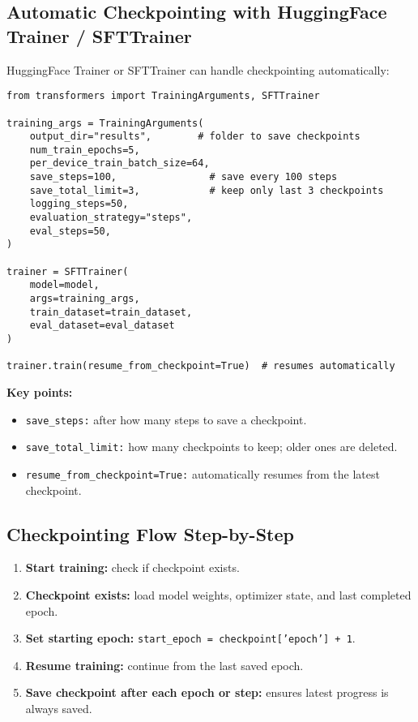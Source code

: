 \documentclass[a4paper, 12pt]{article}
\begin{document}
\subsection*{Automatic Checkpointing with HuggingFace Trainer / SFTTrainer}
HuggingFace Trainer or SFTTrainer can handle checkpointing automatically:

\begin{tcolorbox}[colback=green!5!white, colframe=green!75!black, title=TrainingArguments Example]
\begin{verbatim}
from transformers import TrainingArguments, SFTTrainer

training_args = TrainingArguments(
    output_dir="results",        # folder to save checkpoints
    num_train_epochs=5,
    per_device_train_batch_size=64,
    save_steps=100,                # save every 100 steps
    save_total_limit=3,            # keep only last 3 checkpoints
    logging_steps=50,
    evaluation_strategy="steps",
    eval_steps=50,
)

trainer = SFTTrainer(
    model=model,
    args=training_args,
    train_dataset=train_dataset,
    eval_dataset=eval_dataset
)

trainer.train(resume_from_checkpoint=True)  # resumes automatically
\end{verbatim}
\end{tcolorbox}

\textbf{Key points:}
\begin{itemize}
    \item \texttt{save\_steps:} after how many steps to save a checkpoint.
    \item \texttt{save\_total\_limit:} how many checkpoints to keep; older ones are deleted.
    \item \texttt{resume\_from\_checkpoint=True:} automatically resumes from the latest checkpoint.
\end{itemize}

\subsection*{Checkpointing Flow Step-by-Step}
\begin{enumerate}
    \item \textbf{Start training:} check if checkpoint exists.
    \item \textbf{Checkpoint exists:} load model weights, optimizer state, and last completed epoch.
    \item \textbf{Set starting epoch:} \texttt{start\_epoch = checkpoint['epoch'] + 1}.
    \item \textbf{Resume training:} continue from the last saved epoch.
    \item \textbf{Save checkpoint after each epoch or step:} ensures latest progress is always saved.
\end{enumerate}
\end{document}
